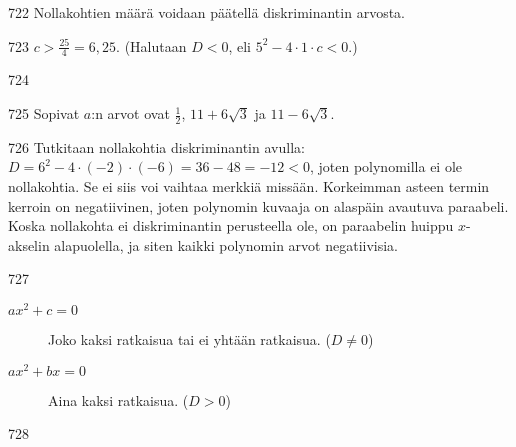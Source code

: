 \begin{Vastaus}{722}
	Nollakohtien määrä voidaan päätellä diskriminantin arvosta.
	
\end{Vastaus}
\begin{Vastaus}{723}
		 $c> \frac{25}{4} =6,25$. (Halutaan $D < 0$, eli $5^2-4\cdot 1 \cdot c <0$.)
	
\end{Vastaus}
\begin{Vastaus}{724}
	
\end{Vastaus}
\begin{Vastaus}{725}
		Sopivat $a$:n arvot ovat $\frac{1}{2}$, $11+6\sqrt{3}$ ja $11-6\sqrt{3}$.
	
\end{Vastaus}
\begin{Vastaus}{726}
	Tutkitaan nollakohtia diskriminantin avulla: $D=6^2-4\cdot (-2)\cdot(-6)=36-48=-12<0$, joten polynomilla ei ole nollakohtia. Se ei siis voi vaihtaa merkkiä missään. Korkeimman asteen termin kerroin on negatiivinen, joten polynomin kuvaaja on alaspäin avautuva paraabeli. Koska nollakohta ei diskriminantin perusteella ole, on paraabelin huippu $x$-akselin alapuolella, ja siten kaikki polynomin arvot negatiivisia.
	
\end{Vastaus}
\begin{Vastaus}{727}
		\begin{description}
			\item[$ax^2+c=0$] Joko kaksi ratkaisua tai ei yhtään ratkaisua. ($D \neq 0$)
			\item[$ax^2+bx=0$] Aina kaksi ratkaisua. ($D > 0$)
		\end{description}
	
\end{Vastaus}
\begin{Vastaus}{728}
	
\end{Vastaus}
